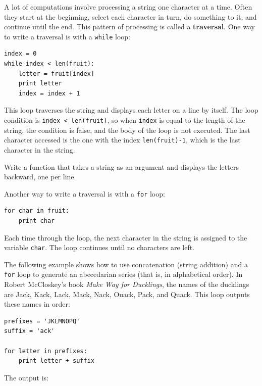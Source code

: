 \documentclass[10pt]{book}
\begin{document}

A lot of computations involve processing a string one character at a
time.  Often they start at the beginning, select each character in
turn, do something to it, and continue until the end.  This pattern of
processing is called a {\bf traversal}.  One way to write a traversal
is with a {\tt while} loop:

\beforeverb
\begin{verbatim}
index = 0
while index < len(fruit):
    letter = fruit[index]
    print letter
    index = index + 1
\end{verbatim}
\afterverb
%
This loop traverses the string and displays each letter on a line by
itself.  The loop condition is {\tt index < len(fruit)}, so
when {\tt index} is equal to the length of the string, the
condition is false, and the body of the loop is not executed.  The
last character accessed is the one with the index {\tt len(fruit)-1},
which is the last character in the string.

\begin{ex}
Write a function that takes a string as an argument
and displays the letters backward, one per line.
\end{ex}

Another way to write a traversal is with a {\tt for} loop:

\beforeverb
\begin{verbatim}
for char in fruit:
    print char
\end{verbatim}
\afterverb
%
Each time through the loop, the next character in the string is assigned
to the variable {\tt char}.  The loop continues until no characters are
left.


The following example shows how to use concatenation (string addition)
and a {\tt for} loop to generate an abecedarian series (that is, in
alphabetical order).  In Robert McCloskey's book {\em Make
Way for Ducklings}, the names of the ducklings are Jack, Kack, Lack,
Mack, Nack, Ouack, Pack, and Quack.  This loop outputs these names in
order:

\beforeverb
\begin{verbatim}
prefixes = 'JKLMNOPQ'
suffix = 'ack'

for letter in prefixes:
    print letter + suffix
\end{verbatim}
\afterverb
%
The output is:
\end{document}
